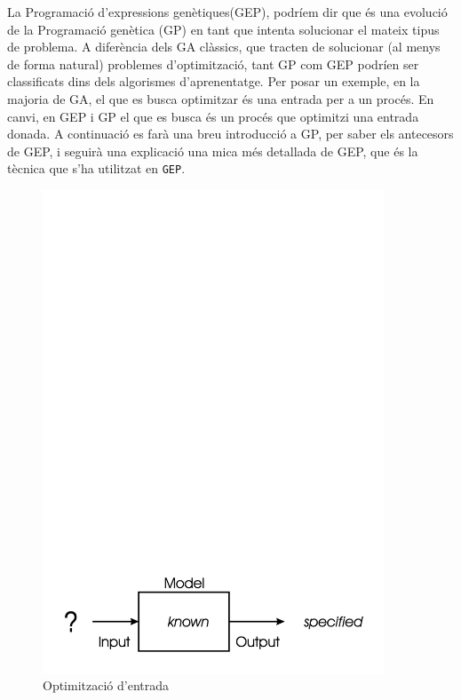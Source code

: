 \documentclass[titlepage,a4paper,12pt]{book}
\begin{document}
La Programació d'expressions genètiques(GEP), podríem dir que és una evolució de
la Programació genètica (GP) en tant que intenta solucionar el mateix tipus de
problema.  A diferència dels GA clàssics, que tracten de solucionar (al menys de
forma natural) problemes d'optimització, tant GP com GEP podríen ser
classificats dins dels algorismes d'aprenentatge.  Per posar un exemple, en la
majoria de GA, el que es busca optimitzar és una entrada per a un procés.  En
canvi, en GEP i GP el que es busca és un procés que optimitzi una entrada
donada.  A continuació es farà una breu introducció a GP, per saber els
antecesors de GEP, i seguirà una explicació una mica més detallada de GEP, que
és la tècnica que s'ha utilitzat en \texttt{GEP}.

\begin{figure} \centering \includegraphics[width=4in]{intro/1-4.jpg}
\caption{\label{fig:ch1-4}Optimització d'entrada}
\end{figure}
\end{document}
